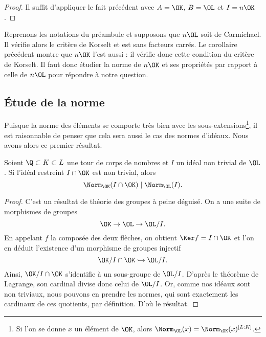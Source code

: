 \documentclass[a4paper, 12pt, oneside]{article}
\begin{document}
\begin{proof}Il suffit d'appliquer le fait précédent avec $A=\OK$, $B=\OL$ et $I = n\OK$.
\end{proof}

Reprenons les notations du préambule et supposons que $n\OL$ soit de Carmichael. Il vérifie alors le critère de Korselt et est sans facteurs carrés. Le corollaire précédent montre que $n\OK$ l'est aussi : il vérifie donc cette condition du critère de Korselt. Il faut donc étudier la norme de $n\OK$ et ses propriétés par rapport à celle de $n\OL$ pour répondre à notre question.

\subsection{Étude de la norme}

Puisque la norme des éléments se comporte très bien avec les sous-extensions\footnote{Si l'on se donne $x$ un élément de $\OK$, alors $\Norm_{\OL}(x) = \Norm_{\OK}(x)^{[L : K]}$.}, il est raisonnable de penser que cela sera aussi le cas des normes d'idéaux. Nous avons alors ce premier résultat.

\begin{fait}\label{fait1} 
	Soient $\Q\subset K \subset L$ une tour de corps de nombres et $I$ un idéal non trivial de $\OL$. Si l'idéal restreint $I\cap \OK$ est non trivial, alors $$\Norm_{\OK}(I \cap \OK) \mid \Norm_{\OL}(I).$$
\end{fait}

\begin{proof}
C'est un résultat de théorie des groupes à peine déguisé. On a une suite de morphismes de groupes $$\OK\to \OL \to \OL/I.$$ En appelant $f$ la composée des deux flèches, on obtient $\Ker f = I\cap \OK$ et l'on en déduit l'existence d'un morphisme de groupes injectif $$\OK/I\cap \OK \hookrightarrow \OL/I.$$ Ainsi, $\OK/ I\cap \OK$ s'identifie à un sous-groupe de $\OL/I$. D'après le théorème de Lagrange, son cardinal divise donc celui de $\OL/I$. Or, comme nos idéaux sont non triviaux, nous pouvons en prendre les normes, qui sont exactement les cardinaux de ces quotients, par définition. D'où le résultat.
\end{proof}

\end{document}
